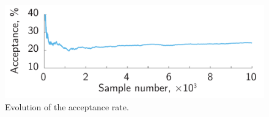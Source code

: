 \begin{figure}
  \centering
  \includegraphics[width=0.7\linewidth]{include/figures/acceptance.pdf}
  \caption{Evolution of the acceptance rate.}
  \vspace{-0.5em}
\end{figure}
